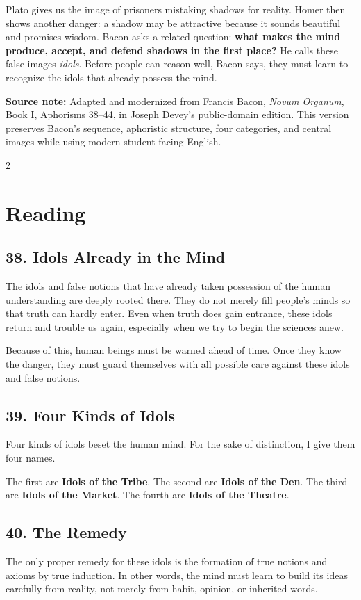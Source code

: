 \documentclass[12pt]{article}
\newcommand{\focusbox}[1]{%
\vspace{0.4em}\noindent\colorbox{gray!12}{\begin{minipage}{0.96\linewidth}#1\end{minipage}}\vspace{0.5em}}
\begin{document}
Plato gives us the image of prisoners mistaking shadows for reality. Homer then shows another danger: a shadow may be attractive because it sounds beautiful and promises wisdom. Bacon asks a related question: \textbf{what makes the mind produce, accept, and defend shadows in the first place?} He calls these false images \textit{idols}. Before people can reason well, Bacon says, they must learn to recognize the idols that already possess the mind.

\focusbox{\textbf{Source note:} Adapted and modernized from Francis Bacon, \textit{Novum Organum}, Book I, Aphorisms 38--44, in Joseph Devey's public-domain edition. This version preserves Bacon's sequence, aphoristic structure, four categories, and central images while using modern student-facing English.}

\begin{multicols}{2}
\section*{Reading}

\subsection*{38. Idols Already in the Mind}
The idols and false notions that have already taken possession of the human understanding are deeply rooted there. They do not merely fill people's minds so that truth can hardly enter. Even when truth does gain entrance, these idols return and trouble us again, especially when we try to begin the sciences anew.

Because of this, human beings must be warned ahead of time. Once they know the danger, they must guard themselves with all possible care against these idols and false notions.

\subsection*{39. Four Kinds of Idols}
Four kinds of idols beset the human mind. For the sake of distinction, I give them four names.

The first are \textbf{Idols of the Tribe}. The second are \textbf{Idols of the Den}. The third are \textbf{Idols of the Market}. The fourth are \textbf{Idols of the Theatre}.

\subsection*{40. The Remedy}
The only proper remedy for these idols is the formation of true notions and axioms by true induction. In other words, the mind must learn to build its ideas carefully from reality, not merely from habit, opinion, or inherited words.


\end{multicols}
\end{document}
